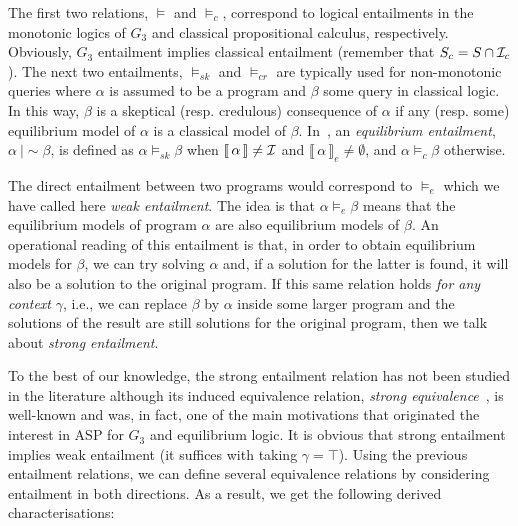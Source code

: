 \documentclass{tlp}
\def\cI{{\cal I}}
\newcommand{\den}[1]{\llbracket \, #1 \, \rrbracket}
\def\eqmodels{\ |\!\!\!\sim}
\begin{document}
The first two relations, $\models$ and $\models_c$, correspond to logical entailments in the monotonic logics of $G_3$ and classical propositional calculus, respectively. Obviously, $G_3$ entailment implies classical entailment (remember that $S_c=S\cap \cI_c$). The next two entailments, $\models_{sk}$ and $\models_{cr}$ are typically used for non-monotonic queries where $\alpha$ is assumed to be a program and $\beta$ some query in classical logic. In this way, $\beta$ is a skeptical (resp. credulous) consequence of $\alpha$ if any (resp. some) equilibrium model of $\alpha$ is a classical model of $\beta$. In~\cite{Pea06}, an  \emph{equilibrium entailment}, $\alpha \eqmodels \beta$, is defined as $\alpha \models_{sk} \beta$ when $\den\alpha \neq \cI$ and $\den{\alpha}_e \neq \emptyset$, and $\alpha \models_c \beta$ otherwise.


The direct entailment between two programs would correspond to $\models_e$ which we have called here \emph{weak entailment}. The idea is that $\alpha \models_e \beta$ means that the equilibrium models of program $\alpha$ are also equilibrium models of $\beta$. An operational reading of this entailment is that, in order to obtain equilibrium models for $\beta$, we can try solving $\alpha$ and, if a solution for the latter is found, it will also be a solution to the original program. If this same relation holds \emph{for any context} $\gamma$, i.e., we can replace $\beta$ by $\alpha$ inside some larger program and the solutions of the result are still solutions for the original program, then we talk about \emph{strong entailment}.

To the best of our knowledge, the strong entailment relation has not been studied in the literature although its induced equivalence relation, \emph{strong equivalence}~\cite{LPV01}, is well-known and was, in fact, one of the main motivations that originated the interest in ASP for $G_3$ and equilibrium logic. It is obvious that strong entailment implies weak entailment (it suffices with taking $\gamma=\top$). Using the previous entailment relations, we can define several equivalence relations by considering entailment in both directions. As a result, we get the following derived characterisations:
\end{document}
